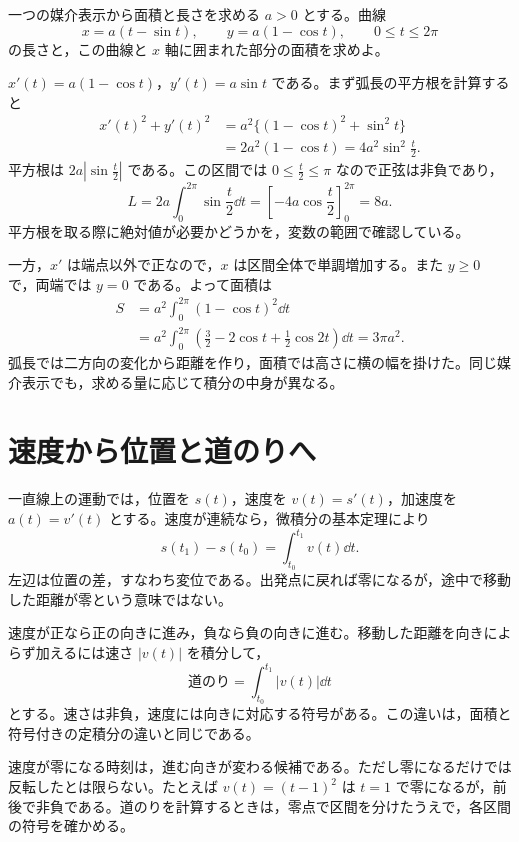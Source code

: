 \begin{example}{一つの媒介表示から面積と長さを求める}
$a>0$ とする。曲線
\[
x=a(t-\sin t),\qquad y=a(1-\cos t),\qquad 0\leq t\leq2\pi
\]
の長さと，この曲線と $x$ 軸に囲まれた部分の面積を求めよ。
\end{example}

$x'(t)=a(1-\cos t)$，$y'(t)=a\sin t$ である。まず弧長の平方根を計算すると
\[
\begin{aligned}
x'(t)^2+y'(t)^2
 &=a^2\{(1-\cos t)^2+\sin^2t\}\\
 &=2a^2(1-\cos t)=4a^2\sin^2\frac t2.
\end{aligned}
\]
平方根は $2a|\sin\frac t2|$ である。この区間では $0\leq\frac t2\leq\pi$ なので正弦は非負であり，
\[
L=2a\int_0^{2\pi}\sin\frac t2\dd t
 =\left[-4a\cos\frac t2\right]_0^{2\pi}=8a.
\]
平方根を取る際に絶対値が必要かどうかを，変数の範囲で確認している。

一方，$x'$ は端点以外で正なので，$x$ は区間全体で単調増加する。また $y\geq0$ で，両端では $y=0$ である。よって面積は
\[
\begin{aligned}
S&=a^2\int_0^{2\pi}(1-\cos t)^2\dd t\\
 &=a^2\int_0^{2\pi}\left(\frac32-2\cos t+\frac12\cos2t\right)\dd t
 =3\pi a^2.
\end{aligned}
\]
弧長では二方向の変化から距離を作り，面積では高さに横の幅を掛けた。同じ媒介表示でも，求める量に応じて積分の中身が異なる。

\section{速度から位置と道のりへ}\label{節:運動と積分}

一直線上の運動では，位置を $s(t)$，速度を $v(t)=s'(t)$，加速度を $a(t)=v'(t)$ とする。速度が連続なら，微積分の基本定理により
\[
s(t_1)-s(t_0)=\int_{t_0}^{t_1}v(t)\dd t.
\]
左辺は位置の差，すなわち変位である。出発点に戻れば零になるが，途中で移動した距離が零という意味ではない。

速度が正なら正の向きに進み，負なら負の向きに進む。移動した距離を向きによらず加えるには速さ $|v(t)|$ を積分して，
\begin{equation}\label{式:道のり}
\text{道のり}=\int_{t_0}^{t_1}|v(t)|\dd t
\end{equation}
とする。速さは非負，速度には向きに対応する符号がある。この違いは，面積と符号付きの定積分の違いと同じである。

速度が零になる時刻は，進む向きが変わる候補である。ただし零になるだけでは反転したとは限らない。たとえば $v(t)=(t-1)^2$ は $t=1$ で零になるが，前後で非負である。道のりを計算するときは，零点で区間を分けたうえで，各区間の符号を確かめる。

